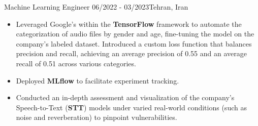 \resumeSubheadingReza
{Machine Learning Engineer}{}
{06/2022 - 03/2023}{Tehran, Iran}
{
  \vspace{-12pt}
  \begin{itemize}
    \item {Leveraged Google's  within the \textbf{TensorFlow} framework to automate the categorization of audio files by gender and age, fine-tuning the model on the company's labeled dataset. Introduced a custom loss function that balances precision and recall, achieving an average precision of 0.55 and an average recall of 0.51 across various categories.}
    \item {Deployed \textbf{MLflow} to facilitate experiment tracking.}
    \item {Conducted an in-depth assessment and visualization of the company's Speech-to-Text (\textbf{STT}) models under varied real-world conditions (such as noise and reverberation) to pinpoint vulnerabilities.}
  \end{itemize}
}
